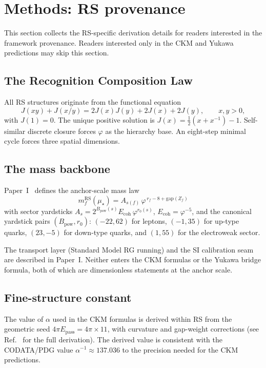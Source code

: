 \documentclass[11pt]{article}
\theoremstyle{remark}
\newcommand{\phig}{\varphi}
\newcommand{\mustar}{\mu_\star}
\newcommand{\Epass}{E_{\mathrm{pass}}}
\newcommand{\Ecoh}{E_{\mathrm{coh}}}
\newcommand{\Bpow}{B_{\mathrm{pow}}}
\begin{document}
\section{Methods: RS provenance}
\label{sec:methods}

This section collects the RS-specific derivation details for
readers interested in the framework provenance.  Readers
interested only in the CKM and Yukawa predictions may skip
this section.

\subsection{The Recognition Composition Law}

All RS structures originate from the functional equation
\[
  J(xy) + J(x/y) = 2J(x)J(y) + 2J(x) + 2J(y),
  \qquad x,y>0,
\]
with $J(1)=0$.  The unique positive solution is
$J(x) = \tfrac{1}{2}(x+x^{-1})-1$.  Self-similar discrete
closure forces $\phig$ as the hierarchy base.  An eight-step
minimal cycle forces three spatial dimensions.

\subsection{The mass backbone}

Paper~I~\cite{backbone} defines the anchor-scale mass law
\[
  m_f^{\mathrm{RS}}(\mustar)
  = A_{s(f)}\,\phig^{\,r_f - 8 + \mathrm{gap}(Z_f)}
\]
with sector yardsticks $A_s=2^{\Bpow(s)}\Ecoh\,\phig^{r_0(s)}$,
$\Ecoh=\phig^{-5}$, and the canonical yardstick pairs
$(\Bpow,r_0)$: $(-22,62)$ for leptons, $(-1,35)$ for up-type
quarks, $(23,-5)$ for down-type quarks, and $(1,55)$ for the
electroweak sector.

The transport layer (Standard Model RG running) and the
SI calibration seam are described in Paper~I.  Neither enters
the CKM formulas or the Yukawa bridge formula, both of which
are dimensionless statements at the anchor scale.

\subsection{Fine-structure constant}

The value of $\alpha$ used in the CKM formulas is derived
within RS from the geometric seed $4\pi\Epass=4\pi\times 11$,
with curvature and gap-weight corrections (see
Ref.~\cite{fullderivation} for the full derivation).
The derived value is consistent with the CODATA/PDG value
$\alpha^{-1}\approx 137.036$ to the precision needed for the
CKM predictions.
\end{document}
